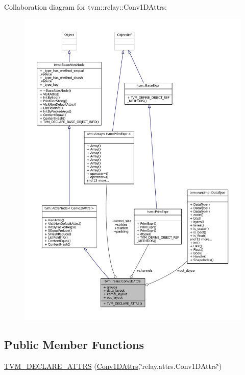 Collaboration diagram for tvm\+:\+:relay\+:\+:Conv1\+D\+Attrs\+:
\nopagebreak
\begin{figure}[H]
\begin{center}
\leavevmode
\includegraphics[width=350pt]{structtvm_1_1relay_1_1Conv1DAttrs__coll__graph}
\end{center}
\end{figure}
\subsection*{Public Member Functions}
\begin{DoxyCompactItemize}
\item 
\hyperlink{structtvm_1_1relay_1_1Conv1DAttrs_ab86c6349e5f37d0bc0a5909ae732b7fe}{T\+V\+M\+\_\+\+D\+E\+C\+L\+A\+R\+E\+\_\+\+A\+T\+T\+RS} (\hyperlink{structtvm_1_1relay_1_1Conv1DAttrs}{Conv1\+D\+Attrs},\char`\"{}relay.\+attrs.\+Conv1\+D\+Attrs\char`\"{})
\end{DoxyCompactItemize}
